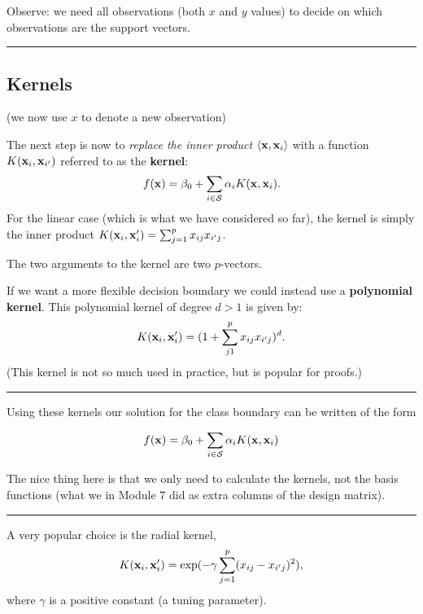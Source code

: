 \documentclass[]{article}
\begin{document}
Observe: we need all observations (both \(x\) and \(y\) values) to
decide on which observations are the support vectors.

\begin{center}\rule{0.5\linewidth}{\linethickness}\end{center}

\hypertarget{kernels}{%
\subsection{Kernels}\label{kernels}}

(we now use \(x\) to denote a new observation)

The next step is now to \emph{replace the inner product}
\(\langle {\bf x}, {\bf x}_i\rangle\) with a function
\(K({\bf x}_i,{\bf x}_{i'})\) referred to as the \textbf{kernel}: \[
f({\bf x})=\beta_0 + \sum_{i \in \mathcal{S}} \alpha_i K({\bf x},{\bf x}_i).
\] For the linear case (which is what we have considered so far), the
kernel is simply the inner product
\(K({\bf x}_i,{\bf x}_i')=\sum_{j=1}^p x_{ij}x_{i'j}\).

The two arguments to the kernel are two \(p\)-vectors.

If we want a more flexible decision boundary we could instead use a
\textbf{polynomial kernel}. This polynomial kernel of degree \(d>1\) is
given by: \[
K({\bf x}_i,{\bf x}_i')=(1+\sum_{j1}^p x_{ij} x_{i'j})^d.
\] (This kernel is not so much used in practice, but is popular for
proofs.)

\begin{center}\rule{0.5\linewidth}{\linethickness}\end{center}

Using these kernels our solution for the class boundary can be written
of the form

\[f({\bf x})=\beta_0 +\sum_{i\in \cal{S}} \alpha_i K({\bf x},{\bf x}_i)\]

The nice thing here is that we only need to calculate the kernels, not
the basis functions (what we in Module 7 did as extra columns of the
design matrix).

\begin{center}\rule{0.5\linewidth}{\linethickness}\end{center}

A very popular choice is the radial kernel, \[
K({\bf x}_i,{\bf x}_i')=\exp(-\gamma \sum_{j=1}^p (x_{ij}-x_{i'j})^2),
\] where \(\gamma\) is a positive constant (a tuning parameter).
\end{document}

